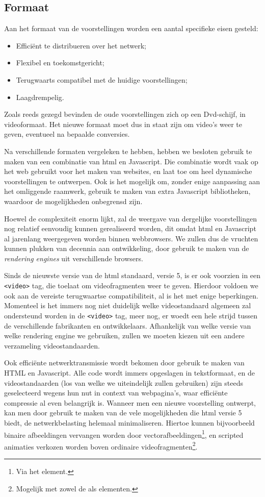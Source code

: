 \documentclass[verslag.tex]{subfiles}
\begin{document}
\subsection{Formaat}

Aan het formaat van de voorstellingen worden een aantal specifieke eisen gesteld:
\begin{itemize}
\item Efficiënt te distribueren over het netwerk;
\item Flexibel en toekomstgericht;
\item Terugwaarts compatibel met de huidige voorstellingen;
\item Laagdrempelig.
\end{itemize}

Zoals reeds gezegd bevinden de oude voorstellingen zich op een Dvd-schijf, in videoformaat. Het nieuwe formaat moet dus in staat zijn om video's weer te geven, eventueel na bepaalde conversies.

Na verschillende formaten vergeleken te hebben, hebben we besloten gebruik te maken van een combinatie van \ac{html} en Javascript. Die combinatie wordt vaak op het web gebruikt voor het maken van websites, en laat toe om heel dynamische voorstellingen te ontwerpen. Ook is het mogelijk om, zonder enige aanpassing aan het omliggende raamwerk, gebruik te maken van extra Javascript bibliotheken, waardoor de mogelijkheden onbegrensd zijn.

Hoewel de complexiteit enorm lijkt, zal de weergave van dergelijke voorstellingen nog relatief eenvoudig kunnen gerealiseerd worden, dit omdat \ac{html} en Javascript al jarenlang weergegeven worden binnen webbrowsers. We zullen dus de vruchten kunnen plukken van decennia aan ontwikkeling, door gebruik te maken van de \emph{rendering engines} uit verschillende browsers.

Sinds de nieuwste versie van de \ac{html} standaard, versie 5, is er ook voorzien in een \texttt{<video>} tag, die toelaat om videofragmenten weer te geven. Hierdoor voldoen we ook aan de vereiste terugwaartse compatibiliteit, al is het met enige beperkingen. Momenteel is het immers nog niet duidelijk welke videostandaard algemeen zal ondersteund worden in de \texttt{<video>} tag, meer nog, er woedt een hele strijd tussen de verschillende fabrikanten en ontwikkelaars. Afhankelijk van welke versie van welke rendering engine we gebruiken, zullen we moeten kiezen uit een andere verzameling videostandaarden.

Ook efficiënte netwerktransmissie wordt bekomen door gebruik te maken van HTML en Javascript. Alle code wordt immers opgeslagen in tekstformaat, en de videostandaarden (los van welke we uiteindelijk zullen gebruiken) zijn steeds geselecteerd wegens hun nut in context van webpagina's, waar efficiënte compressie al even belangrijk is. Wanneer men een nieuwe voorstelling ontwerpt, kan men door gebruik te maken van de vele mogelijkheden die \ac{html} versie 5 biedt, de netwerkbelasting helemaal minimaliseren. Hiertoe kunnen bijvoorbeeld binaire afbeeldingen vervangen worden door vectorafbeeldingen\footnote{Via het  element.}, en scripted animaties verkozen worden boven ordinaire videofragmenten\footnote{Mogelijk met zowel de  als  elementen.}.
\end{document}
